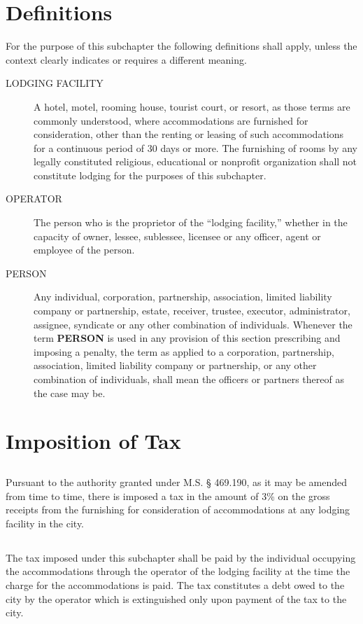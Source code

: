 \section{Definitions}
For the purpose of this subchapter the following definitions shall apply, unless the context clearly indicates or requires a different meaning.
\begin{description}
    \item[LODGING FACILITY] A hotel, motel, rooming house, tourist court, or resort, as those terms are commonly understood, where accommodations are furnished for consideration, other than the renting or leasing of such accommodations for a continuous period of 30 days or more.  The furnishing of rooms by any legally constituted religious, educational or nonprofit organization shall not constitute lodging for the purposes of this subchapter.
    \item[OPERATOR] The person who is the proprietor of the “lodging facility,” whether in the capacity of owner, lessee, sublessee, licensee or any officer, agent or employee of the person.
    \item[PERSON] Any individual, corporation, partnership, association, limited liability company or partnership, estate, receiver, trustee, executor, administrator, assignee, syndicate or any other combination of individuals.  Whenever the term \textbf{PERSON} is used in any provision of this section prescribing and imposing a penalty, the term as applied to a corporation, partnership, association, limited liability company or partnership, or any other combination of individuals, shall mean the officers or partners thereof as the case may be.
\end{description}

\section{Imposition of Tax}
\subsection{}
Pursuant to the authority granted under M.S. § 469.190, as it may be amended from time to time, there is imposed a tax in the amount of 3\% on the gross receipts from the furnishing for consideration of accommodations at any lodging facility in the city.
\subsection{}
The tax imposed under this subchapter shall be paid by the individual occupying the accommodations through the operator of the lodging facility at the time the charge for the accommodations is paid.  The tax constitutes a debt owed to the city by the operator which is extinguished only upon payment of the tax to the city.

